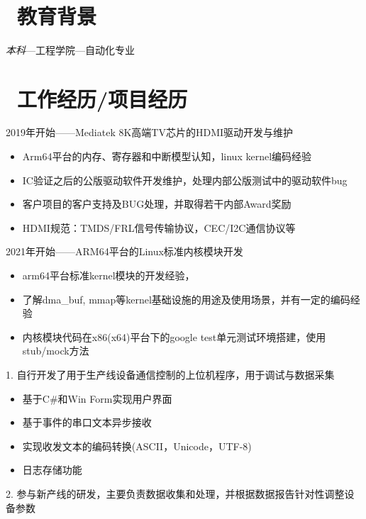 \documentclass{resume}
\begin{document}


 \textperiodcentered\
 
\section{\faGraduationCap\ 教育背景}
\textit{本科}—工程学院—自动化专业

\hspace*{\fill}
\section{\faUsers\ 工作经历/项目经历}

\begin{onehalfspacing}
2019年开始——Mediatek 8K高端TV芯片的HDMI驱动开发与维护
\begin{itemize}
  \item Arm64平台的内存、寄存器和中断模型认知，linux kernel编码经验
  \item IC验证之后的公版驱动软件开发维护，处理内部公版测试中的驱动软件bug
  \item 客户项目的客户支持及BUG处理，并取得若干内部Award奖励
  \item HDMI规范：TMDS/FRL信号传输协议，CEC/I2C通信协议等
\end{itemize}
2021年开始——ARM64平台的Linux标准内核模块开发
\begin{itemize}
  \item arm64平台标准kernel模块的开发经验，
  \item 了解dma\_buf, mmap等kernel基础设施的用途及使用场景，并有一定的编码经验
  \item 内核模块代码在x86(x64)平台下的google test单元测试环境搭建，使用stub/mock方法
\end{itemize}
\end{onehalfspacing}
\hspace*{\fill}
\begin{onehalfspacing}
1. 自行开发了用于生产线设备通信控制的上位机程序，用于调试与数据采集
\begin{itemize}
  \item 基于C\#和Win Form实现用户界面
  \item 基于事件的串口文本异步接收
  \item 实现收发文本的编码转换(ASCII，Unicode，UTF-8)
  \item 日志存储功能
\end{itemize}
2. 参与新产线的研发，主要负责数据收集和处理，并根据数据报告针对性调整设备参数
\end{onehalfspacing}
\end{document}
